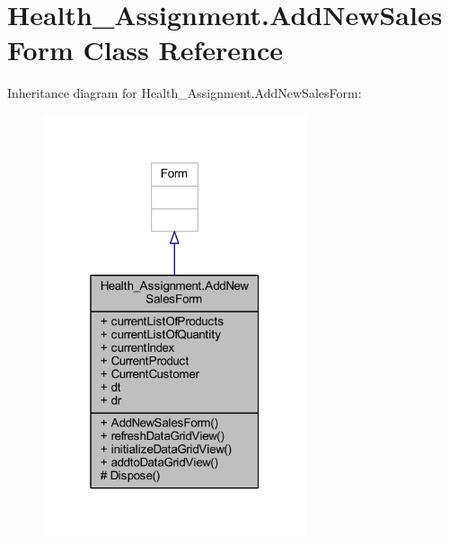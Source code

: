 \hypertarget{class_health___assignment_1_1_add_new_sales_form}{}\section{Health\+\_\+\+Assignment.\+Add\+New\+Sales\+Form Class Reference}
\label{class_health___assignment_1_1_add_new_sales_form}


Inheritance diagram for Health\+\_\+\+Assignment.\+Add\+New\+Sales\+Form\+:\nopagebreak
\begin{figure}[H]
\begin{center}
\leavevmode
\includegraphics[width=220pt]{class_health___assignment_1_1_add_new_sales_form__inherit__graph}
\end{center}
\end{figure}



